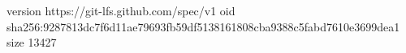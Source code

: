 version https://git-lfs.github.com/spec/v1
oid sha256:9287813dc7f6d11ae79693fb59df5138161808cba9388c5fabd7610e3699dea1
size 13427
